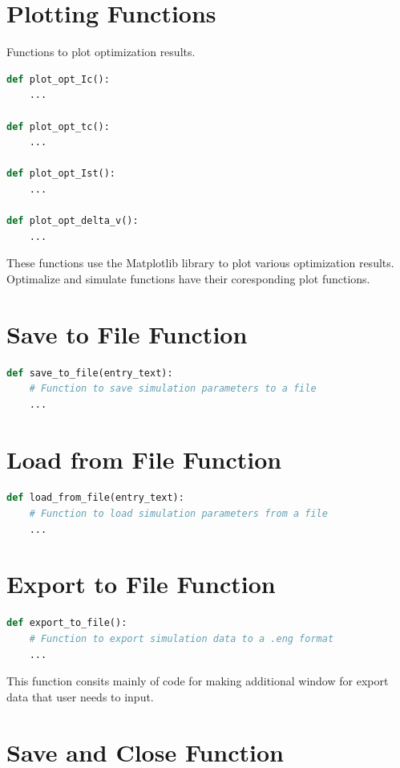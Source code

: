 \documentclass{report}
\begin{document}
\section{Plotting Functions}

Functions to plot optimization results.

\begin{lstlisting}[language=Python]
def plot_opt_Ic():
    ...

def plot_opt_tc():
    ...

def plot_opt_Ist():
    ...

def plot_opt_delta_v():
    ...
\end{lstlisting}

These functions use the Matplotlib library to plot various optimization results. Optimalize and simulate functions have their coresponding plot functions.


\section{Save to File Function}

\begin{lstlisting}[language=Python]
def save_to_file(entry_text):
    # Function to save simulation parameters to a file
    ...
\end{lstlisting}

\section{Load from File Function}

\begin{lstlisting}[language=Python]
def load_from_file(entry_text):
    # Function to load simulation parameters from a file
    ...
\end{lstlisting}

\section{Export to File Function}

\begin{lstlisting}[language=Python]
def export_to_file():
    # Function to export simulation data to a .eng format
    ...
\end{lstlisting}
This function consits mainly of code for making additional window for export data that user needs to input.

\section{Save and Close Function}
\end{document}
